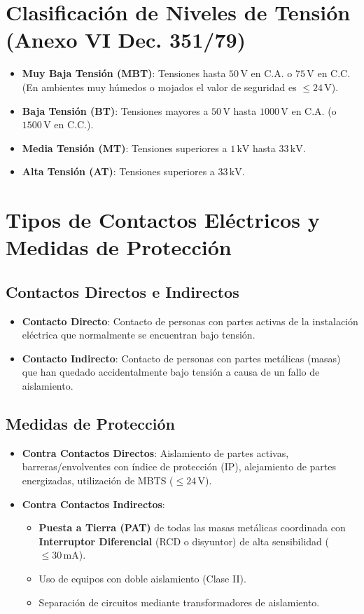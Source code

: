 \documentclass[]{informeutn}
\begin{document}
\section{Clasificación de Niveles de Tensión (Anexo VI Dec. 351/79)}
\begin{itemize}
    \item \textbf{Muy Baja Tensión (MBT)}: Tensiones hasta $50\,\text{V}$ en C.A. o $75\,\text{V}$ en C.C. (En ambientes muy húmedos o mojados el valor de seguridad es $\le 24\,\text{V}$).
    \item \textbf{Baja Tensión (BT)}: Tensiones mayores a $50\,\text{V}$ hasta $1000\,\text{V}$ en C.A. (o $1500\,\text{V}$ en C.C.).
    \item \textbf{Media Tensión (MT)}: Tensiones superiores a $1\,\text{kV}$ hasta $33\,\text{kV}$.
    \item \textbf{Alta Tensión (AT)}: Tensiones superiores a $33\,\text{kV}$.
\end{itemize}

\section{Tipos de Contactos Eléctricos y Medidas de Protección}

\subsection{Contactos Directos e Indirectos}
\begin{itemize}
    \item \textbf{Contacto Directo}: Contacto de personas con partes activas de la instalación eléctrica que normalmente se encuentran bajo tensión.
    \item \textbf{Contacto Indirecto}: Contacto de personas con partes metálicas (masas) que han quedado accidentalmente bajo tensión a causa de un fallo de aislamiento.
\end{itemize}

\subsection{Medidas de Protección}
\begin{itemize}
    \item \textbf{Contra Contactos Directos}: Aislamiento de partes activas, barreras/envolventes con índice de protección (IP), alejamiento de partes energizadas, utilización de MBTS ($\le 24\,\text{V}$).
    \item \textbf{Contra Contactos Indirectos}: 
    \begin{itemize}
        \item \textbf{Puesta a Tierra (PAT)} de todas las masas metálicas coordinada con \textbf{Interruptor Diferencial} (RCD o disyuntor) de alta sensibilidad ($\le 30\,\text{mA}$).
        \item Uso de equipos con doble aislamiento (Clase II).
        \item Separación de circuitos mediante transformadores de aislamiento.
    \end{itemize}
\end{itemize}
\end{document}
